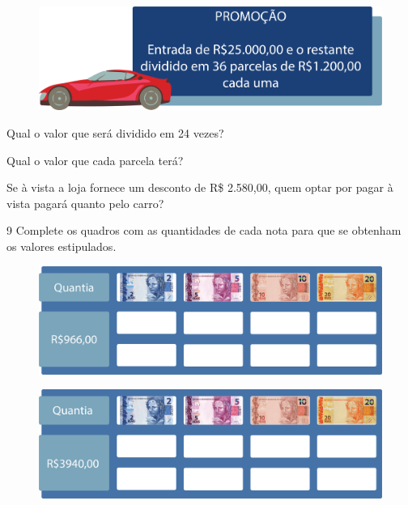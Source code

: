 \begin{figure}[htpb!]
\centering
\includegraphics[width=\textwidth]{./media/image68.png}
\end{figure}

\pagebreak
\begin{escolha}
\item Qual o valor que será dividido em 24 vezes?

\item Qual o valor que cada parcela terá?

\item Se à vista a loja fornece um desconto de R\$ 2.580,00, quem optar por
  pagar à vista pagará quanto pelo carro?
\end{escolha}


\num{9}  Complete os quadros com as quantidades de cada nota para que se
obtenham os valores estipulados.

\begin{figure}[htpb!]
\centering
\includegraphics[width=\textwidth]{./media/image69.png}
\end{figure}

\begin{figure}[htpb!]
\centering
\includegraphics[width=\textwidth]{./media/image70.png}
\end{figure}

